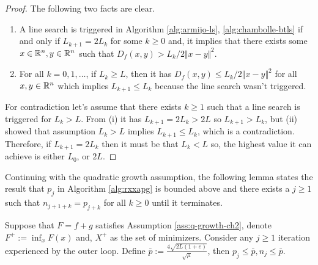 \documentclass[12pt]{report}
\begin{document}
        \begin{proof}
            The following two facts are clear. 
            \begin{enumerate}
                \item A line search is triggered in Algorithm \ref{alg:armijo-ls}, \ref{alg:chambolle-btls} if and only if $L_{k + 1} = 2L_{k}$ for some $k \ge 0$ and, it implies that there exists some $x\in \mathbb R^n, y \in \mathbb R^n$ such that $D_f(x, y) > L_k/2\Vert x - y \Vert^2$. 
                \item For all $k = 0, 1, \ldots $, if $L_k \ge L$, then it has $D_f(x, y) \le L_k/2\Vert x - y\Vert^2$ for all $x, y \in \mathbb R^n$ which implies $L_{k + 1} \le L_k$ because the line search wasn't triggered. 
            \end{enumerate}
            \par
            For contradiction let's assume that there exists $k \ge 1$ such that a line search is triggered for $L_k > L$.
            From (i) it has $L_{k + 1} = 2L_{k} > 2L$ so $L_{k + 1} > L_k$, but (ii) showed that assumption $L_k > L$ implies $L_{k + 1} \le L_k$, which is a contradiction. 
            Therefore, if $L_{k + 1} = 2L_k$ then it must be that $L_k < L$ so, the highest value it can achieve is either $L_0$, or $2L$. 
        \end{proof}
        \par
        Continuing with the quadratic growth assumption, the following lemma states the result that $p_j$ in Algorithm \ref{alg:rxxapg} is bounded above and there exists a $j \ge 1$ such that $n_{j + 1 + k} = p_{j + k}$ for all $k \ge 0$ until it terminates. 
        \begin{lemma}\label{lemma:rxxapg-inner-bnds}
            Suppose that $F = f + g$ satisfies Assumption \ref{ass:q-growth-ch2}, denote $F^+ := \inf_xF(x)$ and, $X^+$ as the set of minimizers. 
            Consider any $j \ge 1$ iteration experienced by the outer loop. 
            Define $\bar p := \frac{4\sqrt{2L(1 + e)}}{\sqrt{\mu}}$, then $p_{j} \le \bar p, n_j \le \bar p$. 
        \end{lemma}
\end{document}

